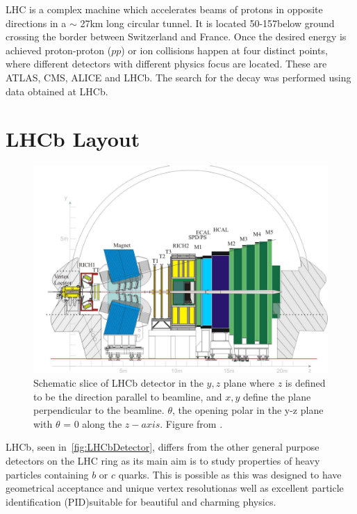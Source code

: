 \DIFaddbegin {}\DIFaddend \Gls{LHC} is a complex machine which accelerates beams of protons in opposite directions in a $\sim$ 27km long circular tunnel. It is located
50-157\m below ground crossing the border between Switzerland and France. Once the desired energy is achieved proton-proton ($pp$) or ion collisions happen at four distinct points, where different detectors with different physics focus are located. These are \Gls{ATLAS}, \Gls{CMS}, \Gls{ALICE} and \Gls{LHCb}. 
The search for the decay \Bmumumu was performed using data obtained at \Gls{LHCb}\DIFaddbegin {}\DIFaddend . 

\section{LHCb Layout }

\begin{figure}
	\centering
	\includegraphics[scale = 0.25]{figs/detector/lhcbdet.pdf}
	\caption{Schematic slice of \Gls{LHCb} detector in the $y,z$ plane where $z$ is defined to be the direction parallel to beamline, and $x,y$ define the plane perpendicular to the beamline. $\theta$, the opening polar in the y-z plane with $\theta$ = 0 along the $z-axis$. Figure from \cite{LHCbdetector}.}
	\label{fig:LHCbDetector}
\end{figure}


\Gls{LHCb}, seen in~\autoref{fig:LHCbDetector}, differs from the other general purpose detectors on the \Gls{LHC} ring as its main aim is to study properties of heavy particles containing $b$ or $c$ quarks. This is possible as this \DIFdelbegin {}\DIFdelend \DIFaddbegin {}\DIFaddend was designed to have \DIFdelbegin {}\DIFdelend \DIFaddbegin {}\DIFaddend geometrical acceptance and unique vertex resolution\DIFaddbegin \DIFadd{, }\DIFaddend as well as excellent particle identification (\Gls{PID})\DIFaddbegin \DIFadd{, }\DIFaddend suitable for beautiful and charming physics.

